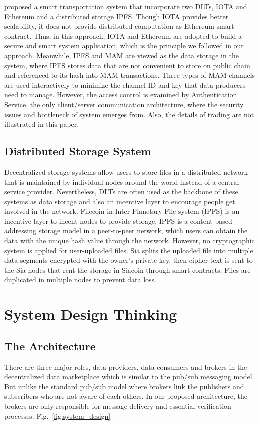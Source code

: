 \documentclass[conference]{IEEEtran}
\begin{document}
\cite{SocialGood} proposed a smart transportation system that incorporate two DLTs, IOTA and Ethereum and a distributed storage IPFS. Though IOTA provides better scalability, it does not provide distributed computation as Ethereum smart contract. Thus, in this approach, IOTA and Ethereum are adopted to build a secure and smart system application, which is the principle we followed in our approach. Meanwhile, IPFS and MAM are viewed as the data storage in the system, where IPFS stores data that are not convenient to store on public chain and referenced to its hash into MAM transactions. Three types of MAM channels are used interactively to minimize the channel ID and key that data producers need to manage. However, the access control is examined by Authentication Service, the only client/server communication architecture, where the security issues and bottleneck of system emerges from. Also, the details of trading are not illustrated in this paper.
  
\subsection{Distributed Storage System}
Decentralized storage systems allow users to store files in a distributed network that is maintained by individual nodes around the world instead of a central service provider. Nevertheless, DLTs are often used as the backbone of these systems as data storage and also an incentive layer to encourage people get involved in the network. Filecoin \cite{FileCoin} in Inter-Planetary File system (IPFS) is an incentive layer to incent nodes to provide storage. IPFS is a content-based addressing storage model in a peer-to-peer network, which users can obtain the data with the unique hash value through the network. However, no cryptographic system is applied for user-uploaded files. Sia\cite{Sia} splits the uploaded file into multiple data segments encrypted with the owner's private key, then cipher text is sent to the Sia nodes that rent the storage in Siacoin through smart contracts. Files are duplicated in multiple nodes to prevent data loss.

\section{System Design Thinking}
\subsection{The Architecture}
There are three major roles, data providers, data consumers and brokers in the decentralized data marketplace which is similar to the pub/sub messaging model. But unlike the standard pub/sub model where brokers link the publishers and subscribers who are not aware of each others. In our proposed architecture, the brokers are only responsible for message delivery and essential verification processes. Fig.~\ref{fig:system_design}
\end{document}

